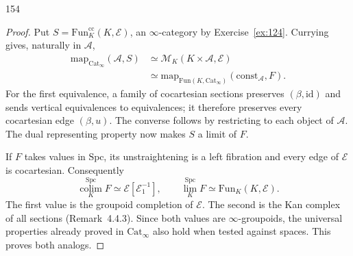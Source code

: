 \begin{exercise}{154}
\begin{proof}
Put $S=\mathrm{Fun}^{\mathrm{cc}}_K(K,\mathcal{E})$, an
$\infty$-category by Exercise~\ref{ex:124}.
Currying gives, naturally in $\mathcal{A}$,
\[
 \begin{aligned}
 \mathrm{map}_{\mathrm{Cat}_\infty}(\mathcal{A},S)
 &\simeq\mathcal{M}_K(K\times\mathcal{A},\mathcal{E})\\
 &\simeq\mathrm{map}_{\mathrm{Fun}(K,\mathrm{Cat}_\infty)}
       (\mathrm{const}_{\mathcal{A}},F).
 \end{aligned}
\]
For the first equivalence, a family of cocartesian sections preserves
$(\beta,\mathrm{id})$ and sends vertical equivalences to equivalences;
it therefore preserves every cocartesian edge $(\beta,u)$.
The converse follows by restricting to each object of $\mathcal{A}$.
The dual representing property now makes $S$ a limit of $F$.

If $F$ takes values in $\mathrm{Spc}$, its unstraightening is a left
fibration and every edge of $\mathcal{E}$ is cocartesian.
Consequently
\[
 \operatorname*{colim}_K^{\mathrm{Spc}}F
   \simeq\mathcal{E}[\mathcal{E}_1^{-1}],\qquad
 \operatorname*{lim}_K^{\mathrm{Spc}}F
   \simeq\mathrm{Fun}_K(K,\mathcal{E}).
\]
The first value is the groupoid completion of $\mathcal{E}$.
The second is the Kan complex of all sections (Remark~4.4.3).
Since both values are $\infty$-groupoids, the universal properties
already proved in $\mathrm{Cat}_\infty$ also hold when tested against
spaces. This proves both analogs.
\end{proof}
\end{exercise}

